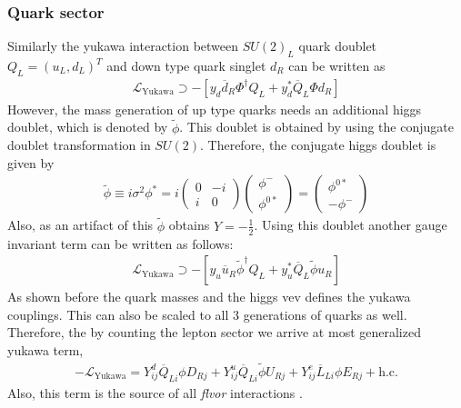 \subsubsection{Quark sector}
Similarly the yukawa interaction between $SU(2)_L$ quark doublet $Q_L=\left(u_{L}, d_{L}\right)^{T}$ and down type quark singlet $d_R$ can be written as 
\begin{eqnarray}\label{downType}
\mathcal{L}_{\mathrm{Yukawa}} \supset-\left[y_{d} \overline{d}_{R} \Phi^{\dagger} Q_{L}+y_{d}^{*} \overline{Q}_{L} \Phi d_{R}\right]
\end{eqnarray}
However, the mass generation of up type quarks needs an additional higgs doublet, which is denoted by $\tilde{\phi}$. This doublet is obtained by using the conjugate doublet transformation in $SU(2)$. Therefore, the conjugate higgs doublet is given by
\begin{eqnarray}
\tilde{\phi} \equiv i \sigma^{2} \phi^{*}=i\left(\begin{array}{cc}{0} & {-i} \\ {i} & {0}\end{array}\right)\left(\begin{array}{c}{\phi^{-}} \\ {\phi^{0 *}}\end{array}\right)=\left(\begin{array}{c}{\phi^{0 *}} \\ {-\phi^{-}}\end{array}\right)
\end{eqnarray}
Also, as an artifact of this $\tilde{\phi}$ obtains $Y=-\frac{1}{2}$. Using this doublet another gauge invariant term can be written as follows:
\begin{eqnarray}\label{upType}
\mathcal{L}_{\mathrm{Yukawa}} \supset-\left[y_{u} \overline{u}_{R} \tilde{\phi}^{\dagger} Q_{L}+y_{u}^{*} \overline{Q}_{L} \tilde{\phi} u_{R}\right]
\end{eqnarray}
As shown before the quark masses and the higgs vev defines the yukawa couplings.  This can also be scaled to all 3 generations of quarks as well. Therefore, the by counting the lepton sector we arrive at most generalized yukawa term,
 \begin{eqnarray}\label{SMYukawa}
 -\mathcal{L}_{\mathrm{Yukawa}}=Y_{i j}^{d} \overline{Q}_{L i} \phi D_{R j}+Y_{i j}^{u} \overline{Q}_{L i} \tilde{\phi} U_{R j}+Y_{i j}^{e} \overline{L}_{L i} \phi E_{R j}+\mathrm{h.c.}
 \end{eqnarray}
Also, this term is the source of all \textit{flvor} interactions \cite{Isidori:2010kg}. 
